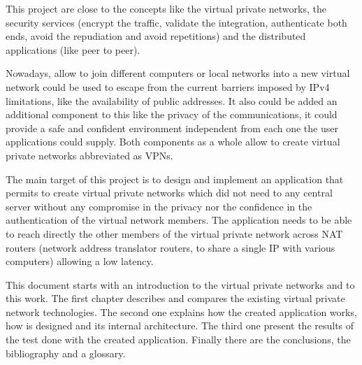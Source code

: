 \begin{overview}{8.3cm}
This project are close to the concepts like the virtual private networks, the security services (encrypt the traffic, validate the integration, authenticate both ends, avoid the repudiation and avoid repetitions) and the distributed applications (like peer to peer).

Nowadays, allow to join different computers or local networks into a new virtual network could be used to escape from the current barriers imposed by IPv4 limitations, like the availability of public addresses. It also could be added an additional component to this like the privacy of the communications, it could provide a safe and confident environment independent from each one the user applications could supply. Both components as a whole allow to create virtual private networks abbreviated as VPNs.

The main target of this project is to design and implement an application that permits to create virtual private networks which did not need to any central server without any compromise in the privacy nor the confidence in the authentication of the virtual network members.
The application needs to be able to reach directly the other members of the virtual private network across NAT routers (network address translator routers, to share a single IP with various computers) allowing a low latency.

This document starts with an introduction to the virtual private networks and to this work.
The first chapter describes and compares the existing virtual private network technologies.
The second one explains how the created application works, how is designed and its internal architecture.
The third one present the results of the test done with the created application.
Finally there are the conclusions, the bibliography and a glossary.
\end{overview}


\thispagestyle{empty}
\tableofcontents

